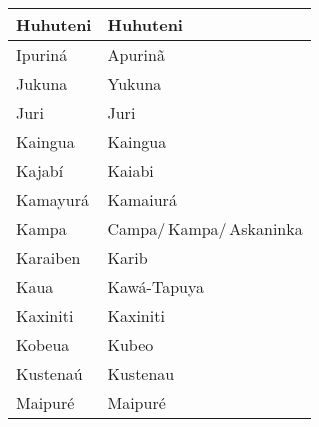 \begin{center}
\begin{tabular}{ | m{12em} | m{4.2cm}| }
\hline
Huhuteni          	       	& Huhuteni \\
\hline
Ipuriná           	       	& Apurinã \\
\hline
Jukuna            	       	& Yukuna \\
\hline
Juri              	       	& Juri \\
\hline
Kaingua           	       	& Kaingua \\
\hline
Kajabí            	       	& Kaiabi \\
\hline
Kamayurá          	       	& Kamaiurá \\
\hline
Kampa             	       	& Campa/\,Kampa/\,Askaninka \\
\hline
Karaiben          	       	& Karib \\
\hline
Kaua              	       	& Kawá-Tapuya \\
\hline
Kaxiniti          	       	& Kaxiniti \\
\hline
Kobeua            	       	& Kubeo \\
\hline
Kustenaú          	       	& Kustenau \\
\hline
Maipuré           	       	& Maipuré \\
\hline
\end{tabular}
\end{center}

\pagebreak

